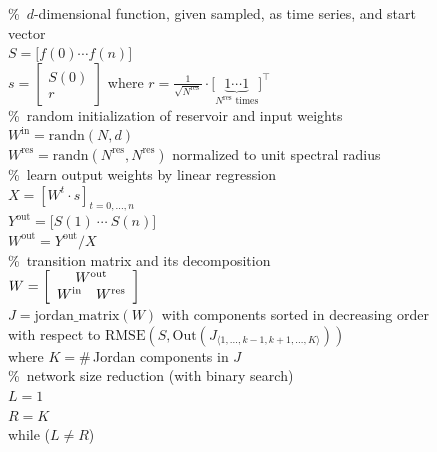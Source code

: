 \documentclass[twoside,11pt]{article}
\theoremstyle{definition}
\begin{document}
\begin{figure}
\newcommand{\commt}[1]{\%~#1\\}%
\begin{algorithmic}[1]\State
        \commt{$d$-dimensional function, given sampled, as time series, and start vector}
        $S = \big[ f(0) \cdots f(n) \big]$\\
	$s = \left[ \begin{array}{c} S(0) \\ r \end{array} \right]$ where
		$r = \frac{1}{\sqrt{N^\mathrm{res}}} \cdot
		\big[ \underbrace{1 \cdots 1}_{N^\mathrm{res} \text{~times}} \big]^\top$\newline
        \\
        \commt{random initialization of reservoir and input weights}
        $W^\mathrm{in} = \mathrm{randn}(N,d)$\\
        $W^\mathrm{res} = \mathrm{randn}(N^\mathrm{res},N^\mathrm{res})$
        	normalized to unit spectral radius\newline
        \\
        \commt{learn output weights by linear regression}
        $X = \left[W^t \cdot s\right]_{t=0,\dots,n}$\\
        $Y^\mathrm{out} = \big[ S(1)\ \cdots\ S(n) \big]$\\
        $W^\mathrm{out} = Y^\mathrm{out}/X$\newline
        \\
        \commt{transition matrix and its decomposition}
        $W = \left[ \begin{array}{cc}
                \multicolumn{2}{c}{W^\mathrm{out}}\\
                W^\mathrm{in} & W^\mathrm{res}
        \end{array} \right]$\\
        $J = \mathrm{jordan\_matrix}(W)$ with components sorted in decreasing order\\
        \quad with respect to $\mathrm{RMSE}\left(S,\mathrm{Out}(J_{\langle 1,\dots,k-1,k+1,\dots,K \rangle})\right)$\\
        \quad where $K = \#$\,Jordan components in $J$\newline
        \\
        \commt{network size reduction (with binary search)}
        $L = 1$\\
        $R = K$\\
        while ($L \neq R$)\\

\end{algorithmic}
\end{figure}
\end{document}
